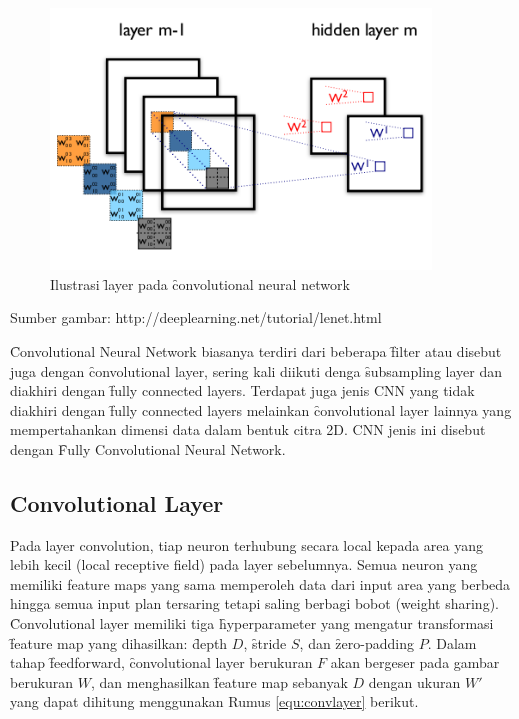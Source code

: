 \begin{figure}
	\centering
	\includegraphics[width=0.9\textwidth,height=0.55\textwidth]
	{pics/featuremap.png}
	\caption{Ilustrasi \f{layer} pada \f{convolutional neural network}}
	\label{fig:featuremap}
\end{figure}
\vspace{-1.2cm}
\begin{center}
	{\small Sumber gambar: http://deeplearning.net/tutorial/lenet.html}
\end{center}

\f{Convolutional Neural Network} biasanya terdiri dari beberapa \f{filter} atau disebut juga dengan \f{convolutional layer}, sering kali diikuti denga \f{subsampling layer} dan diakhiri dengan \f{fully connected layers}. Terdapat juga jenis CNN yang tidak diakhiri dengan \f{fully connected layers} melainkan \f{convolutional layer} lainnya yang mempertahankan dimensi data dalam bentuk citra 2D. CNN jenis ini disebut dengan \f{Fully Convolutional Neural Network}.

\subsection{Convolutional Layer}
Pada layer convolution, tiap neuron terhubung secara local kepada area yang lebih kecil (local receptive field) pada layer sebelumnya. Semua neuron yang memiliki feature maps yang sama memperoleh data dari input area yang berbeda hingga semua input plan tersaring tetapi saling berbagi bobot (weight sharing).\\
\f{Convolutional layer} memiliki tiga \f{hyperparameter} yang mengatur transformasi \f{feature map} yang dihasilkan: \f{depth} $D$, \f{stride} $S$, dan \f{zero-padding} $P$. Dalam tahap \f{feedforward}, \f{convolutional layer} berukuran $F$ akan bergeser pada gambar berukuran $W$, dan menghasilkan \f{feature map} sebanyak $D$ dengan ukuran $W'$ yang dapat dihitung menggunakan Rumus \ref{equ:convlayer} berikut.

